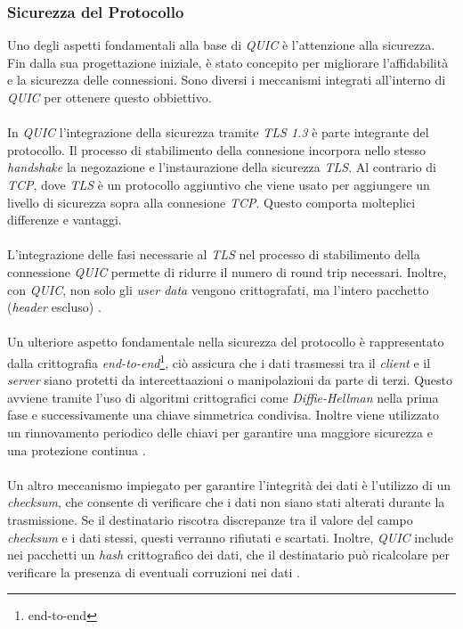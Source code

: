 \subsubsection{Sicurezza del Protocollo}
Uno degli aspetti fondamentali alla base di \emph{QUIC} è l'attenzione alla sicurezza. Fin dalla sua progettazione iniziale, è stato concepito per migliorare l'affidabilità e la sicurezza delle connessioni. 
Sono diversi i meccanismi integrati all'interno di \emph{QUIC} per ottenere questo obbiettivo.
\\\\
In \emph{QUIC} l'integrazione della sicurezza tramite \emph{TLS 1.3} è parte integrante del protocollo. Il processo di stabilimento della connesione incorpora nello stesso \emph{handshake} la negozazione e l'instaurazione della sicurezza \emph{TLS}. 
Al contrario di \emph{TCP}, dove \emph{TLS} è un protocollo aggiuntivo che viene usato per aggiungere un livello di sicurezza sopra alla connesione \emph{TCP}. Questo comporta molteplici differenze e vantaggi.
\\\\
L'integrazione delle fasi necessarie al \emph{TLS} nel processo di stabilimento della connessione \emph{QUIC} permette di ridurre il numero di round trip necessari.
Inoltre, con \emph{QUIC}, non solo gli \emph{user data} vengono crittografati, ma l'intero pacchetto (\emph{header} escluso) \cite{site:Explaining-QUIC}.
\\\\
Un ulteriore aspetto fondamentale nella sicurezza del protocollo è rappresentato dalla crittografia \emph{end-to-end}\footnote{\gls{end-to-end}}, ciò assicura che i dati trasmessi tra il \emph{client} e il \emph{server} siano protetti da intercettaazioni o manipolazioni da parte di terzi.
Questo avviene tramite l'uso di algoritmi crittografici come \emph{Diffie-Hellman} nella prima fase e successivamente una chiave simmetrica condivisa. Inoltre viene utilizzato un rinnovamento periodico delle chiavi per garantire una maggiore sicurezza e una protezione continua \cite{site:quic-security}.
\\\\
Un altro meccanismo impiegato per garantire l'integrità dei dati è l'utilizzo di un \emph{checksum}, che consente di verificare che i dati non siano stati alterati durante la trasmissione.
Se il destinatario riscotra discrepanze tra il valore del campo \emph{checksum} e i dati stessi, questi verranno rifiutati e scartati.
Inoltre, \emph{QUIC} include nei pacchetti un \emph{hash} crittografico dei dati, che il destinatario può ricalcolare per verificare la presenza di eventuali corruzioni nei dati \cite{site:quic-security}.
